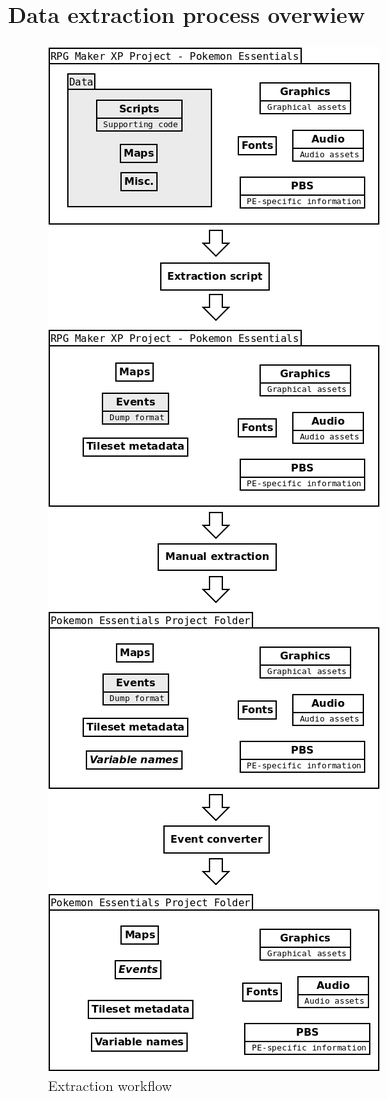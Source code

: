 \documentclass[11pt]{article}
\begin{document}
{\subsection{Data extraction process overwiew}
\begin{figure}
	\begin{center}
		\includegraphics[width=1\linewidth]{Steps}
	\end{center}
	\caption{Extraction workflow}
\end{figure}


}
\end{document}
